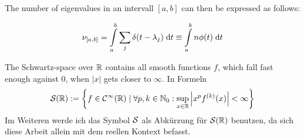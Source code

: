 The number of eigenvalues in an intervall $[a, b]$ can then be expressed as follows:

\begin{equation} \label{eq:nu_a_b}
    \nu_{[a, b]} = \int\limits_a^b \sum_j \delta(t - \lambda_j) \;\mathrm{d}t \equiv \int\limits_a^b n \phi(t) \;\mathrm{d}t
\end{equation}

\begin{definition}  \label{def:Schwartz space}
    The Schwartz-space over $\mathbb{R}$ contains all smooth functions $f$,
    which fall fast enough against $0$, when $|x|$ gets closer to $\infty$. \cite{richtmyer}
    In Formeln
    $$\mathcal{S}(\mathbb{R}) := \left\{f \in \mathcal{C}^{\infty}(\mathbb{R}) \mid \forall p, k \in \mathbb{N}_0: \sup_{x \in \mathbb{R}} \left| x^pf^{(k)}(x)\right| < \infty \right\}$$
    Im Weiteren werde ich das Symbol $\mathcal{S}$ als Abkürzung für $\mathcal{S}(\mathbb{R})$ benutzen,
    da sich diese Arbeit allein mit dem reellen Kontext befasst.
\end{definition}